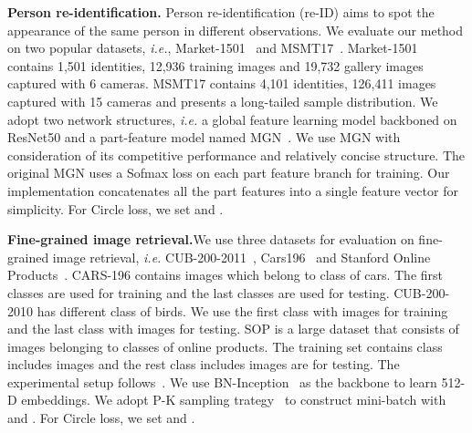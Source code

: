 \documentclass[10pt,twocolumn,letterpaper]{article}
\begin{document}
\textbf{Person re-identification.}\quad 
Person re-identification (re-ID) aims to spot the appearance of the same person in different observations. We evaluate our method on two popular datasets, \emph{i.e.}, Market-1501~\cite{Zheng_2015_ICCVmarket} and MSMT17~\cite{Wei_2018_CVPRMSMT17}. Market-1501 contains 1,501 identities, 12,936 training images and 19,732 gallery images captured with 6 cameras. MSMT17 contains 4,101 identities, 126,411 images captured with 15 cameras and presents a long-tailed sample distribution. We adopt two network structures, \emph{i.e.} a global feature learning model backboned on ResNet50 and a part-feature model named MGN~\cite{Wang_2018MGN}. We use MGN with consideration of its competitive performance and relatively concise structure. The original MGN uses a Sofmax loss on each part feature branch for training. Our implementation concatenates all the part features into a single feature vector for simplicity. For Circle loss, we set  and .




\textbf{Fine-grained image retrieval.}\quad We use three datasets for evaluation on fine-grained image retrieval, \textit{i.e.} CUB-200-2011~\cite{WahCUB_200_2011}, Cars196~\cite{krause20133d} and Stanford Online Products~\cite{oh2016deep}. 
CARS-196 contains  images which belong to  class of cars. The first  classes are used for training and the last  classes are used for testing. CUB-200-2010 has  different class of birds. We use the first  class with  images for training and the last  class with  images for testing. SOP is a large dataset that consists of  images belonging to  classes of online products. The training set contains  class includes  images and the rest  class includes  images are for testing.
The experimental setup follows~\cite{oh2016deep}. We use BN-Inception~\cite{ioffe2015batch} as the backbone to learn 512-D embeddings. We adopt P-K sampling trategy~\cite{hermans2017defense} to construct mini-batch with  and . 
For Circle loss, we set  and .
\end{document}
